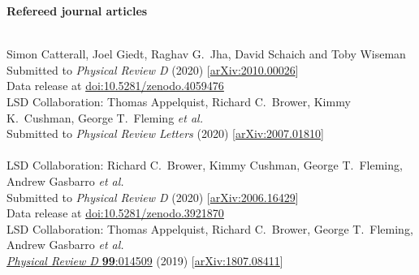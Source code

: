 \begin{spacelist}
  \item {\large \bfseries Refereed journal articles}
  \begin{revnumerate}
    \setlength{\topsep}{-8 pt}
    \setlength{\itemsep}{10 pt}
    \setlength{\leftmargin}{0 mm}
    \pagebreakitem
       \\
      Simon Catterall, Joel Giedt, Raghav G.~Jha, David Schaich and Toby Wiseman \\
      Submitted to \textit{Physical Review D} (2020) [\href{http://arxiv.org/abs/2010.00026}{arXiv:2010.00026}] \\
      Data release at \href{https://doi.org/10.5281/zenodo.4059476}{doi:10.5281/zenodo.4059476}
    \pagebreakitem
       \\
      LSD Collaboration: Thomas Appelquist, Richard C.~Brower, Kimmy K.~Cushman, George T.~Fleming \textit{et al.} \\ %
      Submitted to \textit{Physical Review Letters} (2020) [\href{http://arxiv.org/abs/2007.01810}{arXiv:2007.01810}] \\
    \pagebreakitem
       \\
      LSD Collaboration: Richard C.~Brower, Kimmy Cushman, George T.~Fleming, Andrew Gasbarro \textit{et al.} \\ %
      Submitted to \textit{Physical Review D} (2020) [\href{http://arxiv.org/abs/2006.16429}{arXiv:2006.16429}] \\
      Data release at \href{https://doi.org/10.5281/zenodo.3921870}{doi:10.5281/zenodo.3921870}
    \pagebreakitem
       \\
      LSD Collaboration: Thomas Appelquist, Richard C.~Brower, George T.~Fleming, Andrew Gasbarro \textit{et al.} \\ %
      \href{http://dx.doi.org/10.1103/PhysRevD.99.014509}{\textit{Physical Review D} \textbf{99}:014509} (2019) [\href{http://arxiv.org/abs/1807.08411}{arXiv:1807.08411}]

\end{revnumerate}
\end{spacelist}
